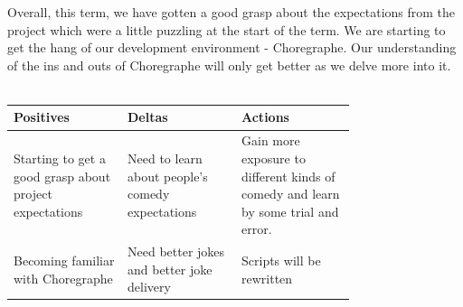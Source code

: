 \documentclass[onecolumn, draftclsnofoot,10pt, compsoc]{IEEEtran}
\begin{document}
Overall, this term, we have gotten a good grasp about the expectations from the project which were a little puzzling at the start of the term. We are starting to get the hang of our development environment - Choregraphe. Our understanding of the ins and outs of Choregraphe will only get better as we delve more into it. \\ \\

\begin{tabular}{|p{0.25\linewidth}|p{0.25\linewidth}|p{0.25\linewidth}|}
\hline
\centering  Positives &
\centering Deltas &
\centering Actions \tabularnewline
\hline

Starting to get a good grasp about project expectations &
Need to learn about people's comedy expectations &
Gain more exposure to different kinds of comedy and learn by some trial and error. \\
\hline
Becoming familiar with Choregraphe &
Need better jokes and better joke delivery &
Scripts will be rewritten \\
\hline



\end{tabular}

\pagebreak


% 
% 
\end{document}
